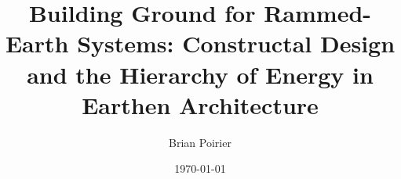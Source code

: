 \documentclass{article}
\begin{document}
\title{Building Ground for Rammed-Earth Systems: Constructal Design and the Hierarchy of Energy in Earthen Architecture}
\author{Brian Poirier}
\date{\today}
\maketitle
\clearpage



% 


\clearpage

\printbibliography
\end{document}
